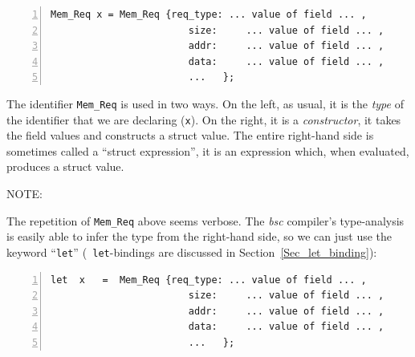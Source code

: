 {\footnotesize
\begin{Verbatim}[frame=single, numbers=left]
   Mem_Req x = Mem_Req {req_type: ... value of field ... ,
                        size:     ... value of field ... ,
                        addr:     ... value of field ... ,
                        data:     ... value of field ... ,
                        ...   };
\end{Verbatim}
}

The identifier {\tt Mem\_Req} is used in two ways.  On the left, as
usual, it is the \emph{type} of the identifier that we are declaring
({\tt x}).  On the right, it is a \emph{constructor}, {\ie} it takes
the field values and constructs a struct value.  The entire right-hand
side is sometimes called a ``struct expression'', {\ie} it is an
expression which, when evaluated, produces a struct value.

\vspace{2ex}

NOTE: 

\vspace{2ex}

The repetition of \verb|Mem_Req| above seems verbose.  The \emph{bsc}
compiler's type-analysis is easily able to infer the type from the
right-hand side, so we can just use the keyword ``\verb|let|'' ({\tt
let}-bindings are discussed in Section~\ref{Sec_let_binding}):


{\footnotesize
\begin{Verbatim}[frame=single, numbers=left]
   let  x   =  Mem_Req {req_type: ... value of field ... ,
                        size:     ... value of field ... ,
                        addr:     ... value of field ... ,
                        data:     ... value of field ... ,
                        ...   };
\end{Verbatim}
}

